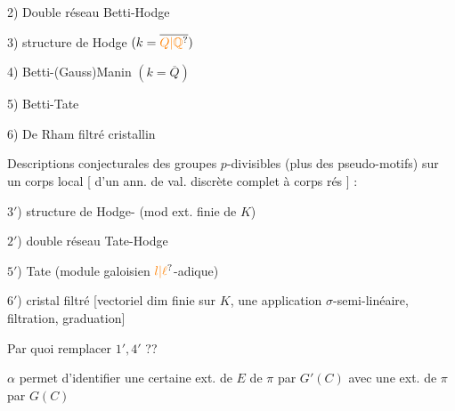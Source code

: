 2) Double réseau Betti-Hodge

3)  structure de Hodge $(k=\overline{\unsure{Q|\mathbb Q}})$

4)  Betti-(Gauss)Manin $(k=\overline Q)$

5)  Betti-Tate

6)  De Rham filtré cristallin

Descriptions conjecturales des groupes $p$-divisibles  (plus  des pseudo-motifs) sur un corps local [  d'un ann. de val. discrète complet à corps rés ] :

$3'$) structure de Hodge- (mod ext. finie de $K$)

$2'$) double réseau Tate-Hodge

$5'$) Tate (module galoisien $\unsure{l|\ell}$-adique)

$6'$)  cristal filtré [vectoriel  dim finie sur $K$, une application $\sigma$-semi-linéaire,  filtration, graduation]

Par quoi remplacer $1',4'$ ??


\deleted{\unsure{$\alpha$}} $\alpha$ permet d'identifier une certaine ext. de $E$ de $\pi$ par $G'(C)$ avec une  ext. de $\pi$ par $G(C)$

